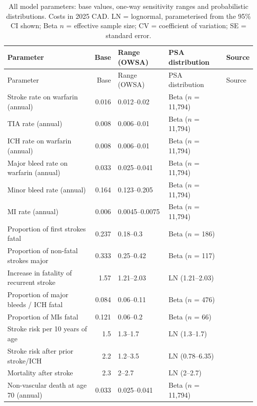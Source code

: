 \documentclass[11pt,letterpaper]{article}
\begin{document}
\footnotesize
\setlength{\LTcapwidth}{\textwidth}
\renewcommand{\arraystretch}{0.95}
\begin{longtable}{@{}p{5.6cm}rp{2.7cm}p{3.1cm}l@{}}
\caption{All model parameters: base values, one-way sensitivity ranges and probabilistic
distributions. Costs in 2025 CAD. LN = lognormal, parameterised from the 95\% CI shown;
Beta $n$ = effective sample size; CV = coefficient of variation; SE = standard error.}\\
\toprule
Parameter & Base & Range (OWSA) & PSA distribution & Source \\
\midrule
\endfirsthead
\toprule
Parameter & Base & Range (OWSA) & PSA distribution & Source \\
\midrule
\endhead
\bottomrule
\endfoot
Stroke rate on warfarin (annual) & 0.016 & 0.012--0.02 & Beta ($n$ = 11,794) & \cite{cadthwe} \\
TIA rate (annual) & 0.008 & 0.006--0.01 & Beta ($n$ = 11,794) & \cite{cadthwe} \\
ICH rate on warfarin (annual) & 0.008 & 0.006--0.01 & Beta ($n$ = 11,794) & \cite{cadthwe} \\
Major bleed rate on warfarin (annual) & 0.033 & 0.025--0.041 & Beta ($n$ = 11,794) & \cite{cadthwe} \\
Minor bleed rate (annual) & 0.164 & 0.123--0.205 & Beta ($n$ = 11,794) & \cite{cadthwe} \\
MI rate (annual) & 0.006 & 0.0045--0.0075 & Beta ($n$ = 11,794) & \cite{cadthwe} \\
Proportion of first strokes fatal & 0.237 & 0.18--0.3 & Beta ($n$ = 186) & \cite{cadthwe} \\
Proportion of non-fatal strokes major & 0.333 & 0.25--0.42 & Beta ($n$ = 117) & \cite{cadthwe} \\
Increase in fatality of recurrent stroke & 1.57 & 1.21--2.03 & LN (1.21--2.03) & \cite{cadthwe} \\
Proportion of major bleeds / ICH fatal & 0.084 & 0.06--0.11 & Beta ($n$ = 476) & \cite{cadthwe} \\
Proportion of MIs fatal & 0.121 & 0.06--0.2 & Beta ($n$ = 66) & \cite{cadthwe} \\
Stroke risk per 10 years of age & 1.5 & 1.3--1.7 & LN (1.3--1.7) & \cite{cadthwe} \\
Stroke risk after prior stroke/ICH & 2.2 & 1.2--3.5 & LN (0.78--6.35) & \cite{cadthwe} \\
Mortality after stroke & 2.3 & 2--2.7 & LN (2--2.7) & \cite{cadthwe} \\
Non-vascular death at age 70 (annual) & 0.033 & 0.025--0.041 & Beta ($n$ = 11,794) & \cite{cadthwe} \\

\end{longtable}
\end{document}
